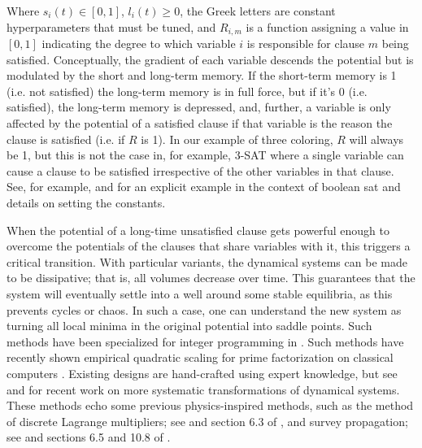 Where $s_i(t) \in [0, 1]$, $l_i(t) \geq 0$, the Greek letters are constant hyperparameters that must be tuned, and $R_{i,m}$ is a function assigning a value in $[0, 1]$ indicating the degree to which variable $i$ is responsible for clause $m$ being satisfied. Conceptually, the gradient of each variable descends the potential but is modulated by the short and long-term memory. If the short-term memory is 1 (i.e. not satisfied) the long-term memory is in full force, but if it's 0 (i.e. satisfied), the long-term memory is depressed, and, further, a variable is only affected by the potential of a satisfied clause if that variable is the reason the clause is satisfied (i.e. if $R$ is 1). In our example of three coloring, $R$ will always be 1, but this is not the case in, for example, 3-SAT where a single variable can cause a clause to be satisfied irrespective of the other variables in that clause. See, for example, \citep{bearden2020efficient} and \citep{zhang2023implementation} for an explicit example in the context of boolean sat and details on setting the constants. 

When the potential of a long-time unsatisfied clause gets powerful enough to overcome the potentials of the clauses that share variables with it, this triggers a critical transition. With particular variants, the dynamical systems can be made to be dissipative; that is, all volumes decrease over time. This guarantees that the system will eventually settle into a well around some stable equilibria, as this prevents cycles or chaos. In such a case, one can understand the new system as turning all local minima in the original potential into saddle points. Such methods have been specialized for integer programming in \citep{traversa2018memcomputing}. Such methods have recently shown empirical quadratic scaling for prime factorization on classical computers \citep{sharp2023scaling}. Existing designs are hand-crafted using expert knowledge, but see \citep{caravelli2021global} and \citep{caravelli2023projective} for recent work on more systematic transformations of dynamical systems. These methods echo some previous physics-inspired methods, such as the method of discrete Lagrange multipliers; see \citep{shang1998discrete} and section 6.3 of \citep{biere2009handbook}, and survey propagation; see \citep{mezard2002analytic} and sections 6.5 and 10.8 of \citep{biere2009handbook}.
